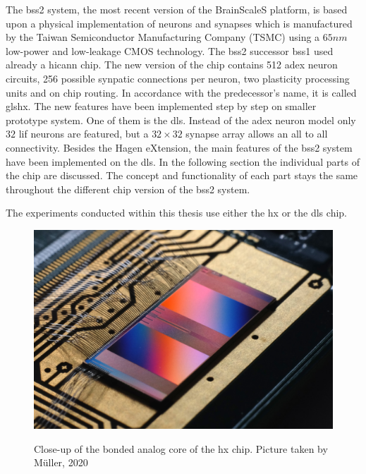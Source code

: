 The \gls{bss2} system, the most recent version of the BrainScaleS platform, is based upon a physical implementation of neurons and synapses which is manufactured by the Taiwan Semiconductor Manufacturing Company (TSMC) using a $65 \si{nm}$ low-power and low-leakage CMOS technology. The \gls{bss2} successor \gls{bss1} used already a \gls{hicann} chip. The new version of the chip contains 512 \gls{adex} neuron circuits, 256 possible synpatic connections per neuron, two plasticity processing units and on chip routing. In accordance with the predecessor's name, it is called gls{hx}. The new features have been implemented step by step on smaller prototype system. One of them is the \gls{dls}. Instead of the \gls{adex} neuron model only $32$ \gls{lif} neurons are featured, but a $32 \times 32$ synapse array allows an all to all connectivity. Besides the Hagen eXtension, the main features of the \gls{bss2} system have been implemented on the \gls{dls}. In the following section the individual parts of the chip are discussed. The concept and functionality of each part stays the same throughout the different chip version of the \gls{bss2} system.

The experiments conducted within this thesis use either the \gls{hx} or the \gls{dls} chip.

\begin{figure}
	\includegraphics[width=\linewidth]{figures/HXcloseup.JPG}
	\label{hxcloseup}
	\caption{Close-up of the bonded analog core of the \gls{hx} chip. Picture taken by Müller, 2020}
\end{figure}


